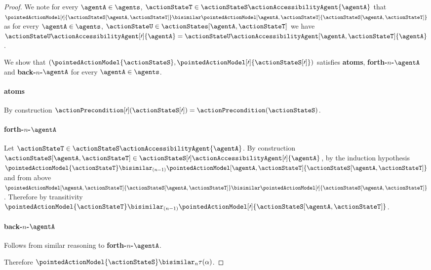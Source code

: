 \documentclass[twoside]{aiml14}
\begin{document}
\begin{proof}
      We note for every $\agentA \in \agents$, 
      $\actionStateT \in \actionStateS \actionAccessibilityAgent{\agentA}$ that
      $\pointedActionModel[\prime]{\actionStateS[\agentA,\actionStateT]} \bisimilar \pointedActionModel[\agentA,\actionStateT]{\actionStateS[\agentA,\actionStateT]}$
      as for every $\agentA \in \agents$, 
      $\actionStateU \in \actionStates[\agentA,\actionStateT]$ we have 
      $\actionStateU \actionAccessibilityAgent[\prime]{\agentA} = \actionStateU \actionAccessibilityAgent[\agentA,\actionStateT]{\agentA}$.
      
      We show that $(\pointedActionModel{\actionStateS}, \pointedActionModel[\prime]{\actionStateS[\prime]})$
      satisfies {\bf atoms}, {\bf forth-$n$-$\agentA$} and {\bf back-$n$-$\agentA$} 
      for every $\agentA \in \agents$.

      \paragraph{atoms} By construction
      $\actionPrecondition[\prime](\actionStateS[\prime]) =
      \actionPrecondition(\actionStateS)$.

      \paragraph{forth-$n$-$\agentA$} 
      Let $\actionStateT \in \actionStateS \actionAccessibilityAgent{\agentA}$.
      By construction $\actionStateS[\agentA,\actionStateT] \in \actionStateS[\prime] \actionAccessibilityAgent[\prime]{\agentA}$, 
      by the induction hypothesis $\pointedActionModel{\actionStateT} \bisimilar_{(n - 1)} \pointedActionModel[\agentA,\actionStateT]{\actionStateS[\agentA,\actionStateT]}$ 
      and from above $\pointedActionModel[\agentA,\actionStateT]{\actionStateS[\agentA,\actionStateT]} \bisimilar \pointedActionModel[\prime]{\actionStateS[\agentA,\actionStateT]}$.
      Therefore by transitivity $\pointedActionModel{\actionStateT} \bisimilar_{(n - 1)} \pointedActionModel[\prime]{\actionStateS[\agentA,\actionStateT]}$.

      \paragraph{back-$n$-$\agentA$} Follows from similar reasoning to {\bf forth-$n$-$\agentA$}.

      Therefore $\pointedActionModel{\actionStateS} \bisimilar_n \tau(\alpha)$.
  \end{proof}
\end{document}

